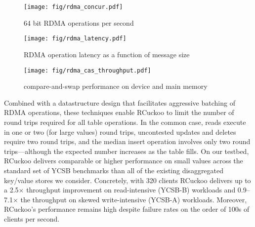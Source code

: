 \begin{figure}
        \texttt{[image: fig/rdma\_concur.pdf]}
        \caption{64 bit RDMA operations per second}
        \label{fig:rdma-benchmarks-a}
\end{figure}

\begin{figure}
        \texttt{[image: fig/rdma\_latency.pdf]}
        \caption{RDMA operation latency as a function of message size~\cite{rdma-latency}}
        \label{fig:rdma-benchmarks-b}
\end{figure}

\begin{figure}
        \texttt{[image: fig/rdma\_cas\_throughput.pdf]}
        \caption{compare-and-swap performance on device and main memory}
        \label{fig:rdma-benchmarks-c}
\end{figure}


Combined with a datastructure design that facilitates aggressive
batching of RDMA operations, these techniques enable RCuckoo to limit
the number of round trips required for all table operations.  In the
common case, reads execute in one or two (for large values) round
trips, uncontested updates and deletes require two round trips, and
the median insert operation involves only two round trips---although
the expected number increases as the table fills.  On our testbed,
RCuckoo delivers comparable or higher performance on small values across the standard set  of YCSB benchmarks than all of the existing disaggregated
key/value stores we consider.  Concretely, with 320 clients RCuckoo
delivers up to a 2.5$\times$ throughput improvement on read-intensive
(YCSB-B) workloads and 0.9--7.1$\times$ the throughput on skewed
write-intensive (YCSB-A) workloads.  Moreover, RCuckoo's
performance remains high despite failure rates on the order of 100s of
clients per second.
